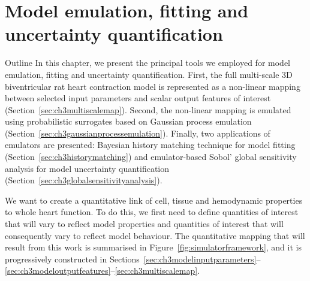 \chapter{Model emulation, fitting and uncertainty 
quantification}\label{cha:chapter3}
%
%
%
\begin{remark}{Outline}
    In this chapter, we present the principal tools we employed for model emulation, fitting and uncertainty quantification. First, the full multi-scale $3$D biventricular rat heart contraction model is represented as a non-linear mapping between selected input parameters and scalar output features of interest (Section~\ref{sec:ch3multiscalemap}). Second, the non-linear mapping is emulated using probabilistic surrogates based on Gaussian process emulation (Section~\ref{sec:ch3gaussianprocessemulation}). Finally, two applications of emulators are presented: Bayesian history matching technique for model fitting (Section~\ref{sec:ch3historymatching}) and emulator-based Sobol' global sensitivity analysis for model uncertainty quantification (Section~\ref{sec:ch3globalsensitivityanalysis}).
\end{remark}

We want to create a quantitative link of cell, tissue and hemodynamic properties to whole heart function. To do this, we first need to define quantities of interest that will vary to reflect model properties and quantities of interest that will consequently vary to reflect model behaviour. The quantitative mapping that will result from this work is summarised in Figure~\ref{fig:simulatorframework}, and it is progressively constructed in Sections~\ref{sec:ch3modelinputparameters}--\ref{sec:ch3modeloutputfeatures}--\ref{sec:ch3multiscalemap}.


